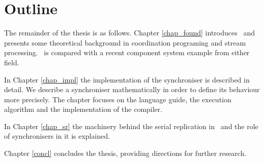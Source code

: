     \section*{Outline}
The remainder of the thesis is as follows. Chapter \ref{chap_found} introduces \ak\ and presents some theoretical background in coordination programing and stream processing. \ak\ is compared with a recent component system example from either field.

In Chapter \ref{chap_impl} the implementation of the synchroniser is described in detail. We describe a synchroniser mathematically in order to define its behaviour more precisely. The chapter focuses on the language guide, the execution algorithm and the implementation of the compiler.

In Chapter \ref{chap_sr} the machinery behind the serial replication in \ak\ and the role of synchronisers in it is explained.

Chapter \ref{concl} concludes the thesis, providing directions for further research.
